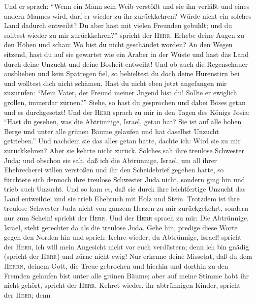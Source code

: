  Und er sprach: ``Wenn ein Mann sein Weib verstößt und sie
ihn verläßt und eines andern Mannes wird, darf er wieder zu ihr
zurückkehren? Würde nicht ein solches Land dadurch entweiht? Du aber
hast mit vielen Freunden gebuhlt; und du solltest wieder zu mir
zurückkehren?'' spricht der \textsc{Herr}.  Erhebe deine
Augen zu den Höhen und schau: Wo bist du nicht geschändet worden? An den
Wegen sitzend, hast du auf sie gewartet wie ein Araber in der Wüste und
hast das Land durch deine Unzucht und deine Bosheit entweiht!
 Und ob auch die Regenschauer ausblieben und kein
Spätregen fiel, so behieltest du doch deine Hurenstirn bei und wolltest
dich nicht schämen.  Hast du nicht eben jetzt angefangen
mir zuzurufen: ``Mein Vater, der Freund meiner Jugend bist du!
 Sollte er ewiglich grollen, immerdar zürnen?'' Siehe, so
hast du gesprochen und dabei Böses getan und es durchgesetzt!
 Und der \textsc{Herr} sprach zu mir in den Tagen des
Königs Josia: ``Hast du gesehen, was die Abtrünnige, Israel, getan hat?
Sie ist auf alle hohen Berge und unter alle grünen Bäume gelaufen und
hat daselbst Unzucht getrieben.''  Und nachdem sie das
alles getan hatte, dachte ich: Wird sie zu mir zurückkehren? Aber sie
kehrte nicht zurück. Solches sah ihre treulose Schwester Juda;
 und obschon sie sah, daß ich die Abtrünnige, Israel, um
all ihrer Ehebrecherei willen verstoßen und ihr den Scheidebrief gegeben
hatte, so fürchtete sich dennoch ihre treulose Schwester Juda nicht,
sondern ging hin und trieb auch Unzucht.  Und so kam es,
daß sie durch ihre leichtfertige Unzucht das Land entweihte; und sie
trieb Ehebruch mit Holz und Stein.  Trotzdem ist ihre
treulose Schwester Juda nicht von ganzem Herzen zu mir zurückgekehrt,
sondern nur zum Schein! spricht der \textsc{Herr}.  Und
der \textsc{Herr} sprach zu mir: Die Abtrünnige, Israel, steht gerechter
da als die treulose Juda.  Gehe hin, predige diese Worte
gegen den Norden hin und sprich: Kehre wieder, du Abtrünnige, Israel!
spricht der \textsc{Herr}, ich will mein Angesicht nicht vor euch
verdüstern; denn ich bin gnädig (spricht der \textsc{Herr}) und zürne
nicht ewig!  Nur erkenne deine Missetat, daß du dem
\textsc{Herrn}, deinem Gott, die Treue gebrochen und hierhin und dorthin
zu den Fremden gelaufen bist unter alle grünen Bäume; aber auf meine
Stimme habt ihr nicht gehört, spricht der \textsc{Herr}. 
Kehret wieder, ihr abtrünnigen Kinder, spricht der \textsc{Herr}; denn
